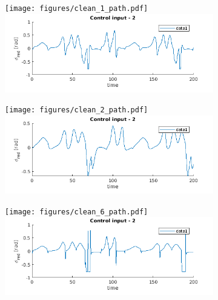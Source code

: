 \begin{figure}[h!]
	\centering
	\begin{subfigure}{0.32\textwidth}
		\texttt{[image: figures/clean\_1\_path.pdf]}
		\includegraphics[width=\textwidth]{figures/clean_1_input.png}
	\end{subfigure}
	\begin{subfigure}{0.32\textwidth}
		\texttt{[image: figures/clean\_2\_path.pdf]}
		\includegraphics[width=\textwidth]{figures/clean_2_input.png}
	\end{subfigure}
	\begin{subfigure}{0.32\textwidth}
		\texttt{[image: figures/clean\_6\_path.pdf]}
		\includegraphics[width=\textwidth]{figures/clean_6_input.png}

\end{subfigure}
\end{figure}
